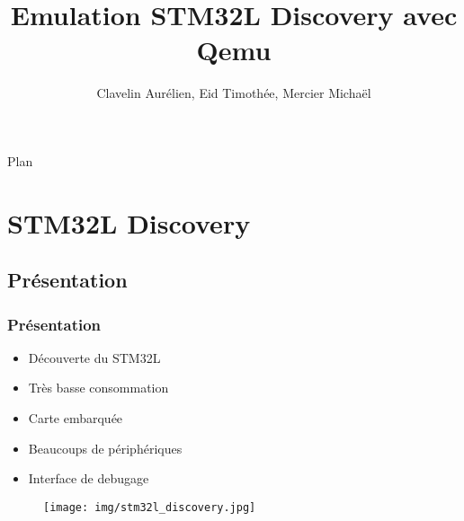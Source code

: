 \documentclass{beamer}
\title[STM32L - Qemu]{Emulation STM32L Discovery avec Qemu}
\author{Clavelin Aurélien, Eid Timothée, Mercier Michaël}
\date{}
\begin{document}
	\begin{frame}
		\titlepage
	\end{frame}
	
	
	\begin{frame} 
		\begin{center}{\Large Plan }\end{center}
		\tableofcontents[hidesubsections]
	\end{frame}
	
	
	
	\section{STM32L Discovery}
		\subsection{Présentation}
			\begin{frame}
				\frametitle{Présentation}
				\begin{itemize}
					\item Découverte du STM32L
					\item Très basse consommation
					\item Carte embarquée
					\item Beaucoups de périphériques
					\item Interface de debugage
				\end{itemize}
				\begin{figure}
					\texttt{[image: img/stm32l\_discovery.jpg]}
				\end{figure}
			\end{frame}
			
			
\end{document}
